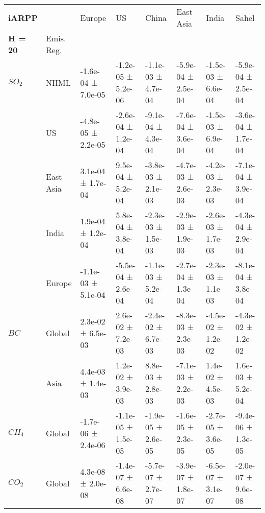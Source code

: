 \documentclass[preview]{standalone}
\newcommand{\nm}{\phantom{-}}
\begin{document}
	\tiny
	\begin{minipage}{\textwidth}
		\setlength\tabcolsep{5pt}
		\begin{tabular}{llllllll}
			\toprule
			\textbf{iARPP}       &        &               Europe &                   US &                China &            East Asia &                India &                Sahel \\
			\textbf{H = 20} & Emis. Reg. &                      &                      &                      &                      &                      &                      \\
			\midrule
$SO_2$ & NHML &  -1.6e-04 ±  7.0e-05 &  -1.2e-05 ±  5.2e-06 &  -1.1e-03 ±  4.7e-04 &  -5.9e-04 ±  2.5e-04 &  -1.5e-03 ±  6.6e-04 &  -5.9e-04 ±  2.5e-04 \\
       & US &  -4.8e-05 ±  2.2e-05 &  -2.6e-04 ±  1.2e-04 &  -9.1e-04 ±  4.3e-04 &  -7.6e-04 ±  3.6e-04 &  -1.5e-03 ±  6.9e-04 &  -3.6e-04 ±  1.7e-04 \\
       & East Asia &   \nm3.1e-04 ±  1.7e-04 &   \nm9.5e-04 ±  5.2e-04 &  -3.8e-03 ±  2.1e-03 &  -4.7e-03 ±  2.6e-03 &  -4.2e-03 ±  2.3e-03 &  -7.1e-04 ±  3.9e-04 \\
       & India &   \nm1.9e-04 ±  1.2e-04 &   \nm5.8e-04 ±  3.8e-04 &  -2.3e-03 ±  1.5e-03 &  -2.9e-03 ±  1.9e-03 &  -2.6e-03 ±  1.7e-03 &  -4.3e-04 ±  2.9e-04 \\
       & Europe &  -1.1e-03 ±  5.1e-04 &  -5.5e-04 ±  2.6e-04 &  -1.1e-03 ±  5.2e-04 &  -2.7e-04 ±  1.3e-04 &  -2.3e-03 ±  1.1e-03 &  -8.1e-04 ±  3.8e-04 \\
\cmidrule(lr){1-8}
$BC$ & Global &   \nm2.3e-02 ±  6.5e-03 &   \nm2.6e-02 ±  7.2e-03 &  -2.4e-02 ±  6.7e-03 &  -8.3e-03 ±  2.3e-03 &  -4.5e-02 ±  1.2e-02 &  -4.3e-02 ±  1.2e-02 \\
       & Asia &   \nm4.4e-03 ±  1.4e-03 &   \nm1.2e-02 ±  3.9e-03 &   \nm8.8e-03 ±  2.8e-03 &  -7.1e-03 ±  2.2e-03 &   \nm1.4e-02 ±  4.5e-03 &   \nm1.6e-03 ±  5.2e-04 \\
\cmidrule(lr){1-8}
$CH_4$ & Global &  -1.7e-06 ±  2.4e-06 &  -1.1e-05 ±  1.5e-05 &  -1.9e-05 ±  2.6e-05 &  -1.6e-05 ±  2.3e-05 &  -2.7e-05 ±  3.6e-05 &  -9.4e-06 ±  1.3e-05 \\
\cmidrule(lr){1-8}
$CO_2$ & Global &   \nm4.3e-08 ±  2.0e-08 &  -1.4e-07 ±  6.6e-08 &  -5.7e-07 ±  2.7e-07 &  -3.9e-07 ±  1.8e-07 &  -6.5e-07 ±  3.1e-07 &  -2.0e-07 ±  9.6e-08 \\
\bottomrule
\end{tabular}

        \end{minipage}
        
\end{document}
